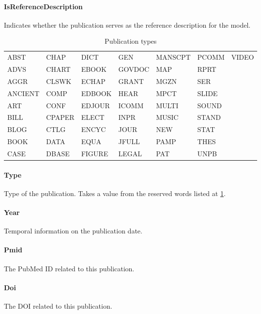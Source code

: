 \documentclass[a4paper]{report}
\begin{document}
\paragraph{IsReferenceDescription}
Indicates whether the publication serves as the reference description for the model.

\begin{table}
    \centering
    \begin{tabular}{l l l l l l l}    
        \hline
        ABST & CHAP & DICT & GEN & MANSCPT & PCOMM & VIDEO \\
        ADVS & CHART & EBOOK & GOVDOC & MAP & RPRT & \\
        AGGR & CLSWK & ECHAP & GRANT & MGZN & SER & \\
        ANCIENT & COMP & EDBOOK & HEAR & MPCT & SLIDE & \\
        ART & CONF & EDJOUR & ICOMM & MULTI & SOUND & \\
        BILL & CPAPER & ELECT & INPR & MUSIC & STAND & \\
        BLOG & CTLG & ENCYC & JOUR & NEW & STAT & \\
        BOOK & DATA & EQUA & JFULL & PAMP & THES & \\
        CASE & DBASE & FIGURE & LEGAL & PAT & UNPB & \\
        \hline
    \end{tabular}
    \caption{Publication types}
    \label{table:publicationtypes}
\end{table}

\paragraph{Type}
Type of the publication. Takes a value from the reserved words listed at \ref{table:publicationtypes}.

\paragraph{Year}
Temporal information on the publication date.

\paragraph{Pmid}
The PubMed ID related to this publication.

\paragraph{Doi}
The DOI related to this publication.
\end{document}
